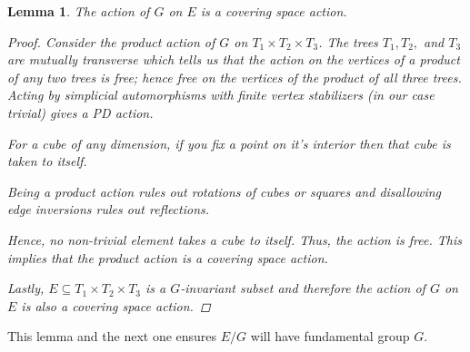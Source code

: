\documentclass[12pt,parskip=full]{report}
\theoremstyle{plain}
\newtheorem{lem}[thm]{Lemma}
\theoremstyle{definition}
\begin{document}
\begin{lem}

    The action of \(G\) on \(E\) is a covering space action.
    
    \begin{proof}
        Consider the product action of \(G\) on \(T_1\times T_2\times T_3\). 
        The trees \(T_1, T_2,\) and \(T_3\) are mutually transverse which tells us that the action on the vertices of a product of any two trees is free; hence free on the vertices of the product of all three trees. Acting by simplicial automorphisms with finite vertex stabilizers (in our case trivial) gives a PD action. 
        
        For a cube of any dimension, if you fix a point on it's interior then that cube is taken to itself.
        
        Being a product action rules out rotations of cubes or squares and disallowing edge inversions rules out reflections.
        
        Hence, no non-trivial element takes a cube to itself. Thus, the action is free. This implies that the product action is a covering space action.
        
        Lastly, \(E\subseteq T_1\times T_2\times T_3\) is a \(G\)-invariant subset and therefore the action of \(G\) on \(E\) is also a covering space action.
    \end{proof}
\end{lem}

This lemma and the next one ensures \(E/G\) will have fundamental group \(G\). 
\end{document}

